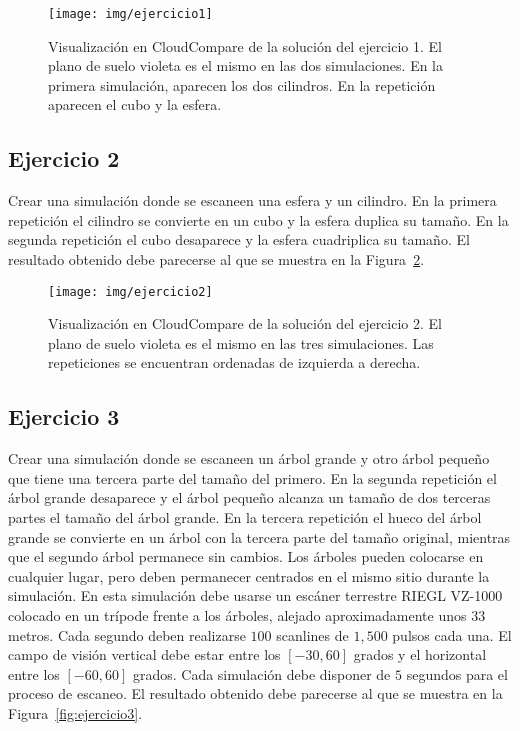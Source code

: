 \documentclass[]{article}
\begin{document}
	\begin{figure}[htb]
		\centering
		\texttt{[image: img/ejercicio1]}
		\caption{Visualización en CloudCompare de la solución del ejercicio 1. El plano de suelo violeta es el mismo en las dos simulaciones. En la primera simulación, aparecen los dos cilindros. En la repetición aparecen el cubo y la esfera.}
		\label{fig:ejercicio1}
	\end{figure}


	\subsection*{Ejercicio 2}
	Crear una simulación donde se escaneen una esfera y un cilindro. En la primera repetición el cilindro se convierte en un cubo y la esfera duplica su tamaño. En la segunda repetición el cubo desaparece y la esfera cuadriplica su tamaño. El resultado obtenido debe parecerse al que se muestra en la Figura~\ref{fig:ejercicio2}.
	
	\begin{figure}[htb]
		\centering
		\texttt{[image: img/ejercicio2]}
		\caption{Visualización en CloudCompare de la solución del ejercicio 2. El plano de suelo violeta es el mismo en las tres simulaciones. Las repeticiones se encuentran ordenadas de izquierda a derecha.}
		\label{fig:ejercicio2}
	\end{figure}

	
	\pagebreak
	
	
	\subsection*{Ejercicio 3}
	Crear una simulación donde se escaneen un árbol grande y otro árbol pequeño que tiene una tercera parte del tamaño del primero. En la segunda repetición el árbol grande desaparece y el árbol pequeño alcanza un tamaño de dos terceras partes el tamaño del árbol grande. En la tercera repetición el hueco del árbol grande se convierte en un árbol con la tercera parte del tamaño original, mientras que el segundo árbol permanece sin cambios. Los árboles pueden colocarse en cualquier lugar, pero deben permanecer centrados en el mismo sitio durante la simulación. En esta simulación debe usarse un escáner terrestre RIEGL VZ-1000 colocado en un trípode frente a los árboles, alejado aproximadamente unos $33$ metros. Cada segundo deben realizarse $100$ scanlines de $1,500$ pulsos cada una. El campo de visión vertical debe estar entre los $[-30, 60]$ grados y el horizontal entre los $[-60, 60]$ grados. Cada simulación debe disponer de $5$ segundos para el proceso de escaneo. El resultado obtenido debe parecerse al que se muestra en la Figura~\ref{fig:ejercicio3}.
	
\end{document}
